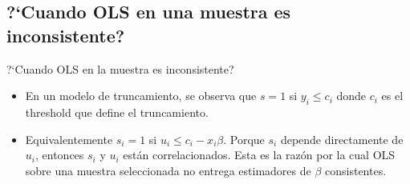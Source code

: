 \subsection{?`Cuando OLS en una muestra es inconsistente?} 
\begin{frame}
	?`Cuando OLS en la muestra es inconsistente?
	\begin{itemize}
		\item En un modelo de truncamiento, se observa que $s=1$ si $y_i\le c_i$ donde $c_i$ es el threshold que define el truncamiento. 
		\item Equivalentemente $s_i=1$ si $u_i\le c_i-x_i\beta$. Porque $s_i$ depende directamente de $u_i$, entonces $s_i$ y $u_i$ están correlacionados. Esta es la razón por la cual OLS sobre una muestra seleccionada no entrega estimadores de $\beta$ consistentes.
	\end{itemize}
\end{frame}

